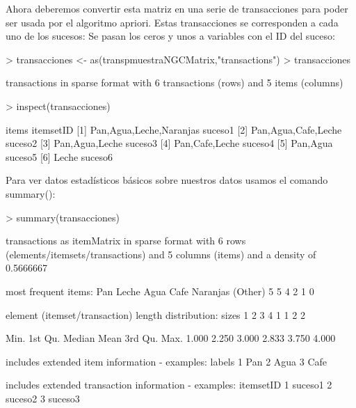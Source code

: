 \documentclass [a4paper] {article}
\begin{document}
Ahora deberemos convertir esta matriz en una serie de transacciones para poder ser usada por el algoritmo apriori. 
Estas transacciones se corresponden a cada uno de los sucesos: Se pasan los ceros y unos a variables con el ID del suceso:
\begin{Schunk}
\begin{Sinput}
> transacciones <- as(transpmuestraNGCMatrix,"transactions")
> transacciones
\end{Sinput}
\begin{Soutput}
transactions in sparse format with
 6 transactions (rows) and
 5 items (columns)
\end{Soutput}
\begin{Sinput}
> inspect(transacciones)
\end{Sinput}
\begin{Soutput}
    items                     itemsetID
[1] {Pan,Agua,Leche,Naranjas} suceso1  
[2] {Pan,Agua,Cafe,Leche}     suceso2  
[3] {Pan,Agua,Leche}          suceso3  
[4] {Pan,Cafe,Leche}          suceso4  
[5] {Pan,Agua}                suceso5  
[6] {Leche}                   suceso6  
\end{Soutput}
\end{Schunk}

Para ver datos estadísticos básicos sobre nuestros datos usamos el comando summary():
\begin{Schunk}
\begin{Sinput}
> summary(transacciones)
\end{Sinput}
\begin{Soutput}
transactions as itemMatrix in sparse format with
 6 rows (elements/itemsets/transactions) and
 5 columns (items) and a density of 0.5666667 

most frequent items:
     Pan    Leche     Agua     Cafe Naranjas  (Other) 
       5        5        4        2        1        0 

element (itemset/transaction) length distribution:
sizes
1 2 3 4 
1 1 2 2 

   Min. 1st Qu.  Median    Mean 3rd Qu.    Max. 
  1.000   2.250   3.000   2.833   3.750   4.000 

includes extended item information - examples:
  labels
1    Pan
2   Agua
3   Cafe

includes extended transaction information - examples:
  itemsetID
1   suceso1
2   suceso2
3   suceso3
\end{Soutput}
\end{Schunk}
\end{document}
